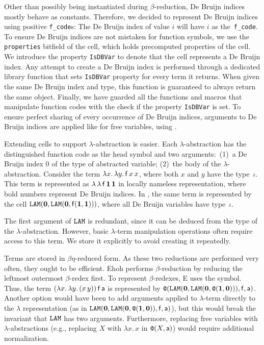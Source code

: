 Other than possibly being instantiated during $\beta$-reduction, De Bruijn
indices mostly behave as constants. Therefore, we decided to represent De
Bruijn indices using positive \texttt{f\_code}s: The De Bruijn index of value $i$
will have $i$ as the~\verb|f_code|. To ensure De Bruijn indices are not
mistaken for function symbols, we use the \texttt{properties} bitfield of the
cell, which holds precomputed properties of %
the cell. We introduce the
property \texttt{IsDBVar} to denote that the cell represents a De
Bruijn index. Any attempt to create a De Bruijn index is performed through
a dedicated library function that sets \texttt{IsDBVar} property for every term it
returns. When given the same De Bruijn index and type, this function is
guaranteed to always return the same object. Finally, we have guarded all the
functions and macros that manipulate function codes with the check if the
property \texttt{IsDBVar} is set. To ensure perfect sharing of every occurrence
of De Bruijn indices, arguments to De Bruijn indices are applied like for free
variables, using \internalat{}.

Extending cells to support $\lambda$-abstraction is easier. Each
$\lambda$-ab\-strac\-tion has the distinguished function code \internallam{} as the head
symbol and two arguments:\ (1)~a De Bruijn index 0 of the type of abstracted variable;
(2)~the body %
of the $\lambda$-abstraction. Consider
the term $\lambda x. \, \lambda y.\, \mathsf{f}\, x \, x$, where both $x$ and $y$ have
the type~$\iota$. This term is represented as $\lambda\,\lambda\, \mathsf{f} \,
\mathbf{1} \, \mathbf{1}$ in locally nameless representation, where bold numbers
represent De Bruijn indices. In \ehohii{}, the same term is represented by the cell
$\texttt{LAM}(\mathbf{0}, \texttt{LAM}(\mathbf{0}, \mathsf{f}(\mathbf{1}, \mathbf{1})))$,
where all De Bruijn variables have type~$\iota$. 

The first argument of $\texttt{LAM}$ is
redundant, since it can be deduced from the type of the $\lambda$-abstraction.
However, basic $\lambda$-term manipulation operations often require access to
this term. We store it explicitly to avoid creating it repeatedly.

Terms are stored in $\beta\eta$-reduced form. As these two reductions are
performed very often, they ought to be efficient. Ehoh
performs $\beta$-reduction by reducing the leftmost outermost $\beta$-redex
first. To represent $\beta$-redexes, E uses the \internalat{} symbol. Thus,
the term $(\lambda
x.\, \lambda y.\,  (x \, y)) \, \mathsf{f} \, \mathsf{a}$ is represented by
$\texttt{@}(\texttt{LAM}(\mathbf{0}, \texttt{LAM}(\mathbf{0}, \texttt{@}(\mathbf{1}, \mathbf{0}))),
\mathsf{f}, \mathsf{a})$. Another option would have been to add arguments applied to
$\lambda$-term directly to the $\lambda$ representation (as in
$\texttt{LAM}(\mathbf{0}, \texttt{LAM}(\mathbf{0}, \allowbreak \texttt{@}(\mathbf{1}, \mathbf{0})),
\mathsf{f}, \mathsf{a})$), but this would break the invariant
that $\texttt{LAM}$ has two arguments. Furthermore, replacing free
variables with $\lambda$-abstractions (e.g., replacing $X$ with $\lambda
x. \, x$ in $\texttt{@}(X, \mathsf{a})$) would require additional normalization.

